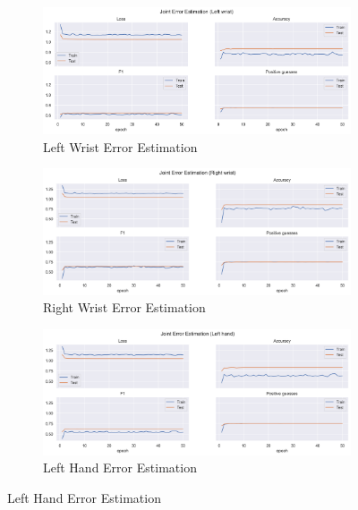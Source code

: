 \begin{figure}[!ht]
  \centering
  \begin{subfigure}[b]{0.47\linewidth}
      \centering
      \includegraphics[width=\textwidth]{figures/Results/v1/jt/Left wrist_ErrorEstimation.png}
      \caption{Left Wrist Error Estimation}
      \label{fig:v1_lewr_jt_ee}
  \end{subfigure}
  \hfill
  \begin{subfigure}[b]{0.47\linewidth}
      \centering
      \includegraphics[width=\textwidth]{figures/Results/v1/jt/Right wrist_ErrorEstimation.png}
      \caption{Right Wrist Error Estimation}
      \label{fig:v1_riwr_jt_ee}
  \end{subfigure}
  \hfill
  \begin{subfigure}[b]{0.47\linewidth}
      \centering
      \includegraphics[width=\textwidth]{figures/Results/v1/jt/Left hand_ErrorEstimation.png}
      \caption{Left Hand Error Estimation}

\end{subfigure}
\end{figure}
